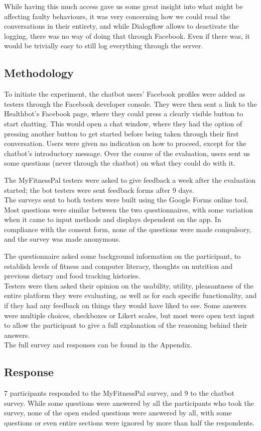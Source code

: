 While having this much access gave us some great insight into what might be affecting faulty behaviours, it was very concerning how we could read the conversations in their entirety, and while Dialogflow allows to deactivate the logging, there was no way of doing that through Facebook. Even if there was, it would be trivially easy to still log everything through the server.
\subsection{Methodology}
To initiate the experiment, the chatbot users' Facebook profiles were added as testers through the Facebook developer console. They were then sent a link to the Healthbot's Facebook page, where they could press a clearly visible button to start chatting. This would open a chat window, where they had the option of pressing another button to get started before being taken through their first conversation. Users were given no indication on how to proceed, except for the chatbot's introductory message. Over the course of the evaluation, users sent us some questions (never through the chatbot) on what they could do with it. 

The MyFitnessPal testers were asked to give feedback a week after the evaluation started; the bot testers were sent feedback forms after 9 days.\\
The surveys sent to both testers were built using the Google Forms online tool. Most questions were similar between the two questionnaires, with some variation when it came to input methods and displays dependent on the app. In compliance with the consent form, none of the questions were made compulsory, and the survey was made anonymous.

The questionnaire asked some background information on the participant, to establish levels of fitness and computer literacy, thoughts on nutrition and previous dietary and food tracking histories.\\
Testers were then asked their opinion on the usability, utility, pleasantness of the entire platform they were evaluating, as well as for each specific functionality, and if they had any feedback on things they would have liked to see. Some answers were multiple choices, checkboxes or Likert scales, but most were open text input to allow the participant to give a full explanation of the reasoning behind their answers.\\
The full survey and responses can be found in the Appendix.
\subsection{Response}
7 participants responded to the MyFitnessPal survey, and 9 to the chatbot survey. While some questions were answered by all the participants who took the survey, none of the open ended questions were answered by all, with some questions or even entire sections were ignored by more than half the respondents. 

